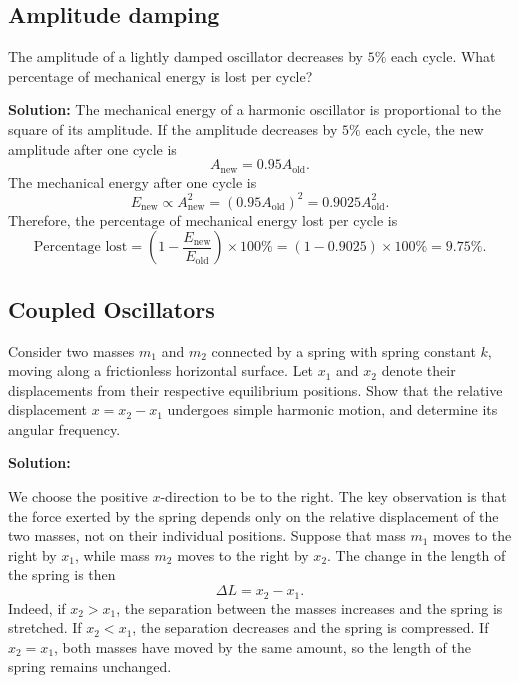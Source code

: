 \documentclass[12pt]{article}
\begin{document}
\subsection{Amplitude damping}
The amplitude of a lightly damped oscillator decreases by $5\%$ each cycle. What percentage of mechanical energy is lost per cycle?

\textbf{Solution:}
The mechanical energy of a harmonic oscillator is proportional to the square of its amplitude. If the amplitude decreases by $5\%$ each cycle, the new amplitude after one cycle is
\begin{equation}
    A_\text{new}=0.95A_\text{old}.
\end{equation}
The mechanical energy after one cycle is
\begin{equation}
    E_\text{new}\propto A_\text{new}^2=(0.95A_\text{old})^2=0.9025A_\text{old}^2.
\end{equation}
Therefore, the percentage of mechanical energy lost per cycle is
\begin{equation}
    \text{Percentage lost} = \left(1 - \frac{E_\text{new}}{E_\text{old}}\right) \times 100\% = \left(1 - 0.9025\right) \times 100\% = 9.75\%.
\end{equation}

\subsection{Coupled Oscillators}

Consider two masses $m_1$ and $m_2$ connected by a spring with spring constant $k$, moving along a frictionless horizontal surface. Let $x_1$ and $x_2$ denote their displacements from their respective equilibrium positions. Show that the relative displacement $x=x_2-x_1$ undergoes simple harmonic motion, and determine its angular frequency.

\textbf{Solution:}

We choose the positive $x$-direction to be to the right. The key observation is that the force exerted by the spring depends only on the relative displacement of the two masses, not on their individual positions. Suppose that mass $m_1$ moves to the right by $x_1$, while mass $m_2$ moves to the right by $x_2$. The change in the length of the spring is then
\[
    \Delta L=x_2-x_1.
\]
Indeed, if $x_2>x_1$, the separation between the masses increases and the spring is stretched. If $x_2<x_1$, the separation decreases and the spring is compressed. If $x_2=x_1$, both masses have moved by the same amount, so the length of the spring remains unchanged.
\end{document}
